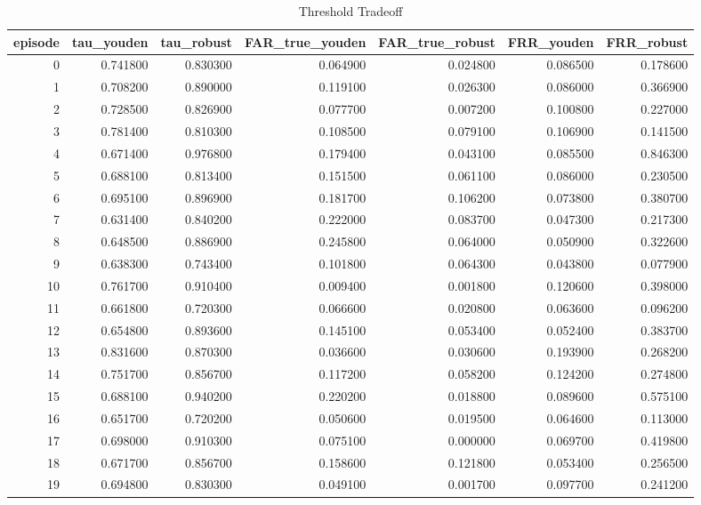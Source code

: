 \begin{table}
\caption{Threshold Tradeoff}
\label{tab_threshold_tradeoff}
\begin{tabular}{rrrrrrr}
\toprule
episode & tau_youden & tau_robust & FAR_true_youden & FAR_true_robust & FRR_youden & FRR_robust \\
\midrule
0 & 0.741800 & 0.830300 & 0.064900 & 0.024800 & 0.086500 & 0.178600 \\
1 & 0.708200 & 0.890000 & 0.119100 & 0.026300 & 0.086000 & 0.366900 \\
2 & 0.728500 & 0.826900 & 0.077700 & 0.007200 & 0.100800 & 0.227000 \\
3 & 0.781400 & 0.810300 & 0.108500 & 0.079100 & 0.106900 & 0.141500 \\
4 & 0.671400 & 0.976800 & 0.179400 & 0.043100 & 0.085500 & 0.846300 \\
5 & 0.688100 & 0.813400 & 0.151500 & 0.061100 & 0.086000 & 0.230500 \\
6 & 0.695100 & 0.896900 & 0.181700 & 0.106200 & 0.073800 & 0.380700 \\
7 & 0.631400 & 0.840200 & 0.222000 & 0.083700 & 0.047300 & 0.217300 \\
8 & 0.648500 & 0.886900 & 0.245800 & 0.064000 & 0.050900 & 0.322600 \\
9 & 0.638300 & 0.743400 & 0.101800 & 0.064300 & 0.043800 & 0.077900 \\
10 & 0.761700 & 0.910400 & 0.009400 & 0.001800 & 0.120600 & 0.398000 \\
11 & 0.661800 & 0.720300 & 0.066600 & 0.020800 & 0.063600 & 0.096200 \\
12 & 0.654800 & 0.893600 & 0.145100 & 0.053400 & 0.052400 & 0.383700 \\
13 & 0.831600 & 0.870300 & 0.036600 & 0.030600 & 0.193900 & 0.268200 \\
14 & 0.751700 & 0.856700 & 0.117200 & 0.058200 & 0.124200 & 0.274800 \\
15 & 0.688100 & 0.940200 & 0.220200 & 0.018800 & 0.089600 & 0.575100 \\
16 & 0.651700 & 0.720200 & 0.050600 & 0.019500 & 0.064600 & 0.113000 \\
17 & 0.698000 & 0.910300 & 0.075100 & 0.000000 & 0.069700 & 0.419800 \\
18 & 0.671700 & 0.856700 & 0.158600 & 0.121800 & 0.053400 & 0.256500 \\
19 & 0.694800 & 0.830300 & 0.049100 & 0.001700 & 0.097700 & 0.241200 \\
\bottomrule
\end{tabular}
\end{table}
